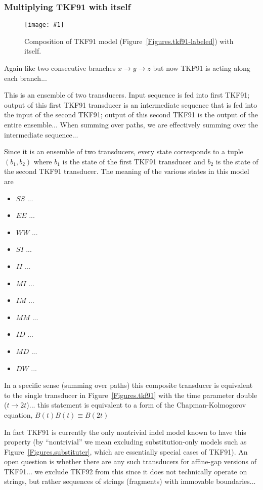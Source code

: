 \documentclass{article}
\newcommand{\figref}[1]{Figure~\ref{Figures.#1}}
\newcommand{\figlabel}[1]{\label{Figures.#1}}
\newcommand{\easyfig}[4]{
\begin{figure}
\texttt{[image: \#1]}
\caption{ \figlabel{#3} #4}
\end{figure}}
\newcommand{\widepdffig}[2]{\easyfig{#1-fig.pdf}{width=\textwidth}{#1}{#2}}
\begin{document}
\subsubsection{Multiplying TKF91 with itself}

\widepdffig{tkf91-tkf91}{Composition of TKF91 model (\figref{tkf91-labeled}) with itself.}

Again like two consecutive branches $x \to y \to z$
but now TKF91 is acting along each branch...

This is an ensemble of two transducers.
Input sequence is fed into first TKF91;
output of this first TKF91 transducer is an intermediate sequence that is fed into the input of the second TKF91;
output of this second TKF91 is the output of the entire ensemble...
When summing over paths, we are effectively summing over the intermediate sequence...

Since it is an ensemble of two transducers, every state corresponds to a tuple $(b_1,b_2)$
where
$b_1$ is the state of the first TKF91 transducer and
$b_2$ is the state of the second TKF91 transducer.
The meaning of the various states in this model are
\begin{itemize}
\item $SS$ ...
\item $EE$ ...
\item $WW$ ...
\item $SI$ ...
\item $II$ ...
\item $MI$ ...
\item $IM$ ...
\item $MM$ ...
\item $ID$ ...
\item $MD$ ...
\item $DW$ ...
\end{itemize}

In a specific sense (summing over paths)
this composite transducer is equivalent to the single transducer in \figref{tkf91}
with the time parameter double ($t \to 2t$)...
this statement is equivalent to a form of the Chapman-Kolmogorov equation,
$B(t)B(t) \equiv B(2t)$

In fact TKF91 is currently the only nontrivial indel model known to have this property
(by ``nontrivial'' we mean excluding substitution-only models such as \figref{substituter},
which are essentially special cases of TKF91).
An open question is whether there are any such transducers for affine-gap versions of TKF91...
we exclude TKF92 from this since it does not technically operate on strings, but rather
sequences of strings (fragments) with immovable boundaries...
\end{document}
